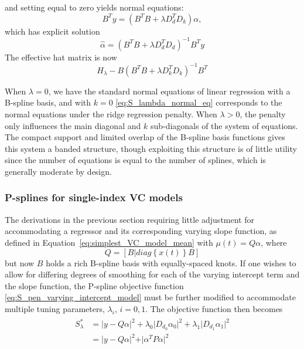 \documentclass[12pt]{article}
\begin{document}
and setting equal to zero yields normal equations:
\begin{equation}\label{eq:S_lambda_normal_eq}
B^T y = \left(B^T B +  \lambda D_d^TD_k\right)\alpha,
\end{equation}
which has explicit solution
\[
\hat{\alpha} = \left(B^T B +  \lambda D_d^TD_d\right)^{-1}B^T y
\]
\noindent
The effective hat matrix is now
\[
H_\lambda - B\left(B^T B +  \lambda D_k^TD_k\right)^{-1}B^T 
\]

When $\lambda = 0$, we have the standard normal equations of linear regression with a B-spline basis, and with $k = 0$ \ref{eq:S_lambda_normal_eq} corresponds to the normal equations under the ridge regression penalty. When $\lambda > 0$, the penalty only influences the main diagonal and $k$ sub-diagonals of the system of equations. The compact support and limited overlap of the B-spline basis functions gives this system a banded structure, though exploiting this structure is of little utility since the number of equations is equal to the number of splines, which is generally moderate by design. 



\subsubsection{P-splines for single-index VC models}

The derivations in the previous section requiring little adjustment for accommodating a regressor and its corresponding varying slope function, as defined in Equation~\ref{eq:simplest_VC_model_mean} with $\mu\left(t\right) =  Q\alpha$, where 
\[
Q = \left[B | diag\left\{x\left(t\right) \right\}B \right]
\]
but now $B$ holds a rich B-spline basis with equally-spaced knots. If one wishes to allow for differing degrees of smoothing for each of the varying intercept term and the slope function, the P-spline objective function \ref{eq:S_pen_varying_intercept_model} must be further modified to accommodate multiple tuning parameters, $\lambda_i$, $i=0,1$. The objective function then becomes
\begin{align} 
\begin{split}
S^*_\lambda &= \vert y- Q\alpha  \vert^2  + \lambda_0 \vert D_{d_0} \alpha_0 \vert^2 + \lambda_1 \vert D_{d_1} \alpha_1 \vert^2\\
	&= \vert y- Q\alpha  \vert^2  + \vert \alpha^T P \alpha \vert^2
\end{split} \label{eq:S_pen_star}
\end{align}
\end{document}
